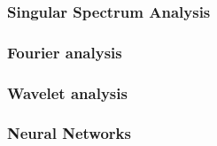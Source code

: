 		\subsubsection{Singular Spectrum Analysis}
		\subsubsection{Fourier analysis} \label{link::fourier_analysis}
		\subsubsection{Wavelet analysis} \label{link::wavelet_analysis}
		\subsubsection{Neural Networks}
			
